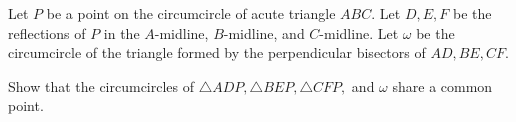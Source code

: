 Let $P$ be a point on the circumcircle of acute triangle $ABC$. Let $D,E,F$ be the reflections of $P$ in the $A$-midline, $B$-midline, and $C$-midline. Let $\omega$ be the circumcircle of the triangle formed by the perpendicular bisectors of $AD, BE, CF$.

Show that the circumcircles of $\triangle ADP, \triangle BEP, \triangle CFP,$ and $\omega$ share a common point.